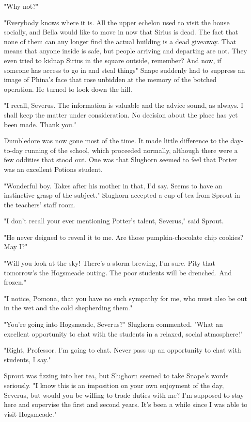 "Why not?"

"Everybody knows where it is. All the upper echelon used to visit the house socially, and Bella would like to move in now that Sirius is dead. The fact that none of them can any longer find the actual building is a dead giveaway. That means that anyone inside is safe, but people arriving and departing are not. They even tried to kidnap Sirius in the square outside, remember? And now, if someone has access to go in and steal things{\el}" Snape suddenly had to suppress an image of Phina's face that rose unbidden at the memory of the botched operation. He turned to look down the hill.

"I recall, Severus. The information is valuable and the advice sound, as always. I shall keep the matter under consideration. No decision about the place has yet been made. Thank you."

\sbreak

Dumbledore was now gone most of the time. It made little difference to the day-to-day running of the school, which proceeded normally, although there were a few oddities that stood out. One was that Slughorn seemed to feel that Potter was an excellent Potions student.

"Wonderful boy. Takes after his mother in that, I'd say. Seems to have an instinctive grasp of the subject." Slughorn accepted a cup of tea from Sprout in the teachers' staff room.

"I don't recall your ever mentioning Potter's talent, Severus," said Sprout.

"He never deigned to reveal it to me. Are those pumpkin-chocolate chip cookies? May I?"

"Will you look at the sky! There's a storm brewing, I'm sure. Pity that tomorrow's the Hogsmeade outing. The poor students will be drenched. And frozen."

"I notice, Pomona, that you have no such sympathy for me, who must also be out in the wet and the cold shepherding them."

"You're going into Hogsmeade, Severus?" Slughorn commented. "What an excellent opportunity to chat with the students in a relaxed, social atmosphere!"

"Right, Professor. I'm going to chat. Never pass up an opportunity to chat with students, I say."

Sprout was fizzing into her tea, but Slughorn seemed to take Snape's words seriously. "I know this is an imposition on your own enjoyment of the day, Severus, but would you be willing to trade duties with me? I'm supposed to stay here and supervise the first and second years. It's been a while since I was able to visit Hogsmeade."

